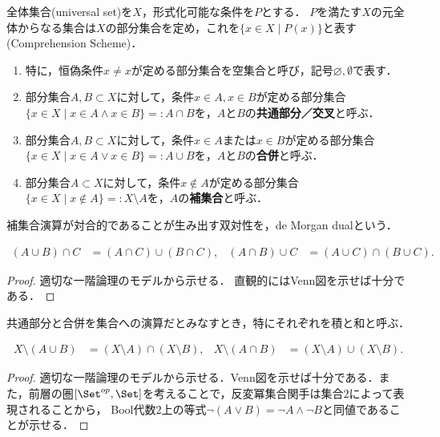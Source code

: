 \documentclass[uplatex,dvipdfmx]{jsreport}
\begin{document}
\begin{axiom}
    全体集合(universal set)を$X$，形式化可能な条件を$P$とする．
    $P$を満たす$X$の元全体からなる集合は$X$の部分集合を定め，これを$\{x\in X\mid P(x)\}$と表す(Comprehension Scheme)．
    \begin{enumerate}
        \item 特に，恒偽条件$x\ne x$が定める部分集合を空集合と呼び，記号$\varnothing,\emptyset$で表す．
        \item 部分集合$A,B\subset X$に対して，条件$x\in A,x\in B$が定める部分集合$\{x\in X\mid x\in A\land x\in B\}=:A\cap B$を，$A$と$B$の\textbf{共通部分／交叉}と呼ぶ．
        \item 部分集合$A,B\subset X$に対して，条件$x\in A$または$x\in B$が定める部分集合$\{x\in X\mid x\in A\lor x\in B\}=:A\cup B$を，$A$と$B$の\textbf{合併}と呼ぶ．
        \item 部分集合$A\subset X$に対して，条件$x\notin A$が定める部分集合$\{x\in X\mid x\notin A\}=:X\setminus A$を，$A$の\textbf{補集合}と呼ぶ．
    \end{enumerate}
\end{axiom}
\begin{remark}
    補集合演算が対合的であることが生み出す双対性を，de Morgan dualという．
\end{remark}

\begin{proposition}[共通部分と合併についての分配則]
    \begin{align*}
        (A\cup B)\cap C&=(A\cap C)\cup(B\cap C),&(A\cap B)\cup C&=(A\cup C)\cap(B\cup C).
    \end{align*}
\end{proposition}
\begin{proof}
    適切な一階論理のモデルから示せる．
    直観的にはVenn図を示せば十分である．
\end{proof}
\begin{remark}
    共通部分と合併を集合への演算だとみなすとき，特にそれぞれを積と和と呼ぶ．
\end{remark}

\begin{proposition}[de Morganの法則]
    \begin{align*}
        X\setminus(A\cup B)&=(X\setminus A)\cap(X\setminus B),&X\setminus(A\cap B)&=(X\setminus A)\cup(X\setminus B).
    \end{align*}
\end{proposition}
\begin{proof}
    適切な一階論理のモデルから示せる．Venn図を示せば十分である．また，前層の圏$[\Set^{op},\Set]$を考えることで，反変冪集合関手は集合$2$によって表現されることから，
    Bool代数$2$上の等式$\lnot(A\lor B)=\lnot A\land \lnot B$と同値であることが示せる．
\end{proof}
\end{document}
